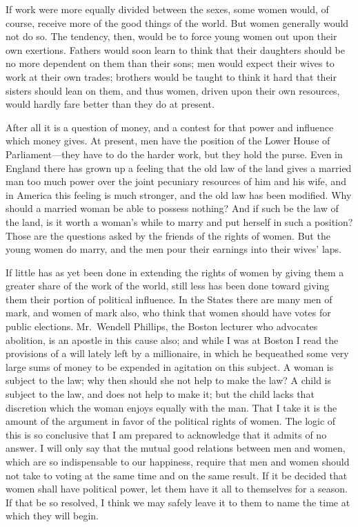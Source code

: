 If work were more equally divided between the sexes, some women
would, of course, receive more of the good things of the world.
But women generally would not do so.  The tendency, then, would be
to force young women out upon their own exertions.  Fathers would
soon learn to think that their daughters should be no more
dependent on them than their sons; men would expect their wives to
work at their own trades; brothers would be taught to think it hard
that their sisters should lean on them, and thus women, driven upon
their own resources, would hardly fare better than they do at
present.

After all it is a question of money, and a contest for that power
and influence which money gives.  At present, men have the position
of the Lower House of Parliament---they have to do the harder work,
but they hold the purse.  Even in England there has grown up a
feeling that the old law of the land gives a married man too much
power over the joint pecuniary resources of him and his wife, and
in America this feeling is much stronger, and the old law has been
modified.  Why should a married woman be able to possess nothing?
And if such be the law of the land, is it worth a woman's while to
marry and put herself in such a position?  Those are the questions
asked by the friends of the rights of women.  But the young women
do marry, and the men pour their earnings into their wives' laps.

If little has as yet been done in extending the rights of women by
giving them a greater share of the work of the world, still less
has been done toward giving them their portion of political
influence.  In the States there are many men of mark, and women of
mark also, who think that women should have votes for public
elections.  Mr.\ Wendell Phillips, the Boston lecturer who advocates
abolition, is an apostle in this cause also; and while I was at
Boston I read the provisions of a will lately left by a
millionaire, in which he bequeathed some very large sums of money
to be expended in agitation on this subject.  A woman is subject to
the law; why then should she not help to make the law?  A child is
subject to the law, and does not help to make it; but the child
lacks that discretion which the woman enjoys equally with the man.
That I take it is the amount of the argument in favor of the
political rights of women.  The logic of this is so conclusive that
I am prepared to acknowledge that it admits of no answer.  I will
only say that the mutual good relations between men and women,
which are so indispensable to our happiness, require that men and
women should not take to voting at the same time and on the same
result.  If it be decided that women shall have political power,
let them have it all to themselves for a season.  If that be so
resolved, I think we may safely leave it to them to name the time
at which they will begin.

